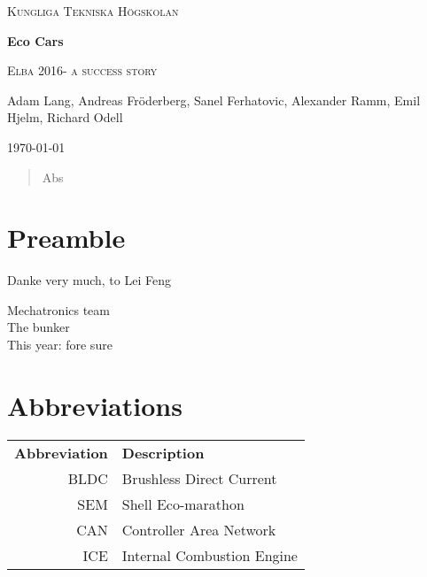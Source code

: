 \documentclass[a4paper, 12pt]{report}
\begin{document}

\begin{titlepage}
	\centering
	{\scshape Kungliga Tekniska Högskolan \par}
	\vspace{2cm}
    {\huge\bfseries Eco Cars\par}
	\vspace{0.5cm}
	{\scshape\Large Elba 2016- a success story\par}
	\vspace{1.5cm}
    {\Large\itshape{Adam Lang, Andreas Fröderberg, Sanel Ferhatovic, Alexander Ramm, Emil Hjelm, Richard Odell\par}}
	\vfill
	\vfill

	{\large \today\par}
\end{titlepage}


\begin{abstract}
Abs
\end{abstract}
\clearpage
\setcounter{page}{3}
\chapter*{Preamble}
Danke very much, to Lei Feng\cite{sota16}

\begin{flushright}Mechatronics team \\ The bunker \\This year: fore sure \end{flushright}

\clearpage
\setcounter{tocdepth}{1}
\tableofcontents

\chapter*{Abbreviations}
\noindent{}\begin{tabular}{r  l}
\textbf{Abbreviation} 	& \textbf{Description} \vspace{.5em} \\
BLDC	&Brushless Direct Current\\
SEM		&Shell Eco-marathon\\
CAN	 	&Controller Area Network\\
ICE 	&Internal Combustion Engine\\
\end{tabular}
\end{document}
